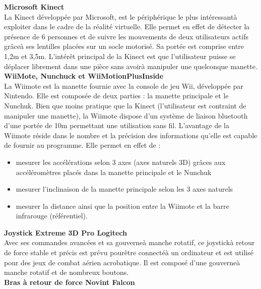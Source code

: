\textbf{Microsoft Kinect}
\\

La Kinect d\'evelopp\'ee par Microsoft, est le p\'eriph\'erique le plus int\'eressant\`a exploiter dans le cadre de la r\'ealit\'e virtuelle. Elle permet en effet de d\'etecter la pr\'esence de 6 personnes et de suivre les mouvements de deux utilisateurs actifs gr\^ace\`a ses lentilles plac\'ees sur un socle motoris\'e. Sa port\'ee est comprise entre 1,2m et 3,5m. L'int\'er\^et principal de la Kinect est que l'utilisateur puisse se d\'eplacer librement dans une pi\`ece sans avoir\`a manipuler une quelconque manette.
\\

\textbf{WiiMote, Nunchuck et WiiMotionPlusInside}
\\

La Wiimote est la manette fournie avec la console de jeu Wii, d\'evelopp\'ee par Nintendo. Elle est compos\'ee de deux parties : la manette principale et le Nunchuk. Bien que moins pratique que la Kinect (l'utilisateur est contraint de manipuler une manette), la Wiimote dispose d'un syst\`eme de liaison bluetooth d'une port\'ee de 10m permettant une utilisation sans fil. L'avantage de la Wiimote r\'eside dans le nombre et la pr\'ecision des informations qu'elle est capable de fournir au programme. 
\newline
Elle permet en effet de :
\begin{itemize}
  \item mesurer les acc\'el\'erations selon 3 axes (axes naturels 3D) gr\^aces aux acc\'el\'erom\`etres plac\'es dans la manette principale et le Nunchuk
  \item mesurer l'inclinaison de la manette principale selon les 3 axes naturels
  \item mesurer la distance ainsi que la position entre la Wiimote et la barre infrarouge (r\'ef\'erentiel).
\end{itemize}

\textbf{Joystick Extreme 3D Pro Logitech}
\\

Avec ses commandes avanc\'ees et sa gouverne\`a manche rotatif, ce joystick\`a retour de force stable et pr\'ecis est pr\'evu pour\^etre connect\'e\`a un ordinateur et est utilis\'e pour des jeux de combat a\'erien acrobatique. Il est compos\'e d'une gouverne\`a manche rotatif et de nombreux boutons.
\\

\textbf{Bras \`a retour de force Novint Falcon}
\\


